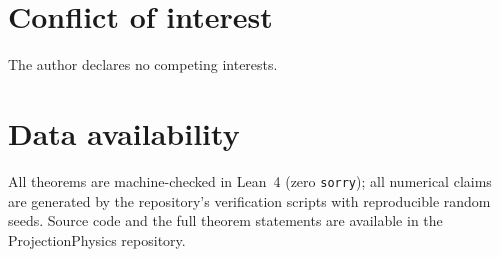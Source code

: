 \documentclass[aps,prd,preprint,superscriptaddress,amsmath,amssymb]{revtex4-2}
\begin{document}
\section*{Conflict of interest}
The author declares no competing interests.

\section*{Data availability}
All theorems are machine-checked in Lean~4 (zero \texttt{sorry});
all numerical claims are generated by the repository's verification
scripts with reproducible random seeds.  Source code and the
full theorem statements are available in the ProjectionPhysics
repository.


\end{document}
